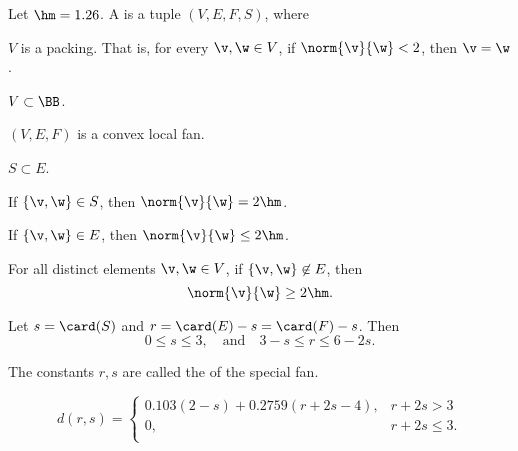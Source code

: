 \begin{definition}
Let $\hm = 1.26$.
A  is a tuple $(V,E,F,S)$, where
\begin{description}
\item {} $V$ is a packing.  That is, for every $\v,\w\in
V$, if $\norm{\v}{\w}<2$, then $\v=\w$.
\item {} $V\subset \BB$.
\item {} $(V,E,F)$ is a convex local fan.
\item {} $S\subset E$.
\item {} If $\{\v,\w\}\in S$, then $\norm{\v}{\w}=2\hm$.
\item {} If $\{\v,\w\}\in E$, then $\norm{\v}{\w}\le 2\hm$.
\item {} For all distinct elements $\v,\w\in V$, if
$\{\v,\w\}\not\in E$, then \begin{displaymath}\norm{\v}{\w}\ge
2\hm.\end{displaymath}
\item {} %
Let      $s=\card(S)$ and $r=\card(E) - s = \card(F)-s$.  Then
\begin{displaymath}0\le s \le 3,\quad\text{and}\quad3-s \le r \le 6 -
2s.\end{displaymath}
\end{description}
The constants $r,s$ are called the  of the special fan.
\end{definition}


\begin{definition}[d]
\begin{displaymath}d(r,s) = \begin{cases}
0.103 (2-s) + 0.2759 (r+2s-4), & r + 2s > 3\\
0, & r + 2s \le 3.\\
\end{cases}\end{displaymath}
\end{definition}

